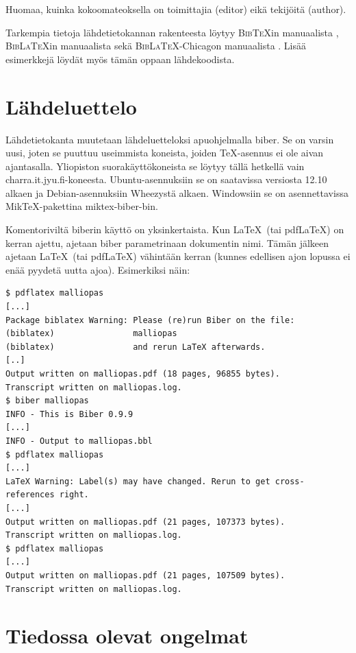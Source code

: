 \documentclass[utf8]{gradu3}
\begin{document}
Huomaa, kuinka kokoomateoksella on toimittajia (editor) eikä tekijöitä
(author).

Tarkempia tietoja lähdetietokannan rakenteesta löytyy
\textsc{Bib\TeX}in manuaalista \parencite{bibtexing},
\textsc{Bib\LaTeX}in manuaalista \parencite[luku~2]{biblatex-manual}
sekä \textsc{Bib\LaTeX}-Chicagon manuaalista
\parencite[luvut 5.1--5.2]{biblatex-chicago-manual}.  Lisää
esimerkkejä löydät myös tämän oppaan lähdekoodista.

\section{Lähdeluettelo}

Lähdetietokanta muutetaan lähdeluetteloksi apuohjelmalla {biber}.  Se
on varsin uusi, joten se puuttuu useimmista koneista, joiden
\TeX-asennus ei ole aivan ajantasalla.  Yliopiston suorakäyttökoneista
se löytyy tällä hetkellä vain charra.it.jyu.fi-koneesta.
Ubuntu-asennuksiin se on saatavissa versiosta 12.10 alkaen ja
Debian-asennuksiin Wheezystä alkaen.  Windowsiin se on asennettavissa
MikTeX-pakettina miktex-biber-bin.

Komentoriviltä biberin käyttö on yksinkertaista.  Kun \LaTeX\ (tai
pdf\LaTeX) on kerran ajettu, ajetaan biber parametrinaan dokumentin
nimi.  Tämän jälkeen ajetaan \LaTeX\ (tai pdf\LaTeX) vähintään kerran
(kunnes edellisen ajon lopussa ei enää pyydetä uutta ajoa).
Esimerkiksi näin:

\begingroup\footnotesize
\begin{verbatim}
$ pdflatex malliopas
[...]
Package biblatex Warning: Please (re)run Biber on the file:
(biblatex)                malliopas
(biblatex)                and rerun LaTeX afterwards.
[..]
Output written on malliopas.pdf (18 pages, 96855 bytes).
Transcript written on malliopas.log.
$ biber malliopas
INFO - This is Biber 0.9.9
[...]
INFO - Output to malliopas.bbl
$ pdflatex malliopas
[...]
LaTeX Warning: Label(s) may have changed. Rerun to get cross-references right.
[...]
Output written on malliopas.pdf (21 pages, 107373 bytes).
Transcript written on malliopas.log.
$ pdflatex malliopas
[...]
Output written on malliopas.pdf (21 pages, 107509 bytes).
Transcript written on malliopas.log.
\end{verbatim}
\endgroup

\section{Tiedossa olevat ongelmat}
\end{document}

